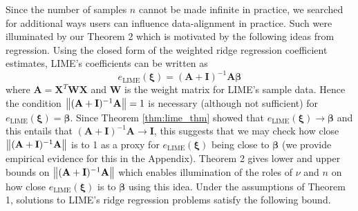 \documentclass[mnsc,blindrev]{informs3}
\begin{document}
             
            Since the number of samples $n$ cannot be made infinite in practice, we searched for additional ways users can influence data-alignment in practice. Such were illuminated by our Theorem 2 which is motivated by the following ideas from regression. Using the closed form of the weighted ridge regression coefficient estimates, LIME's coefficients can be written as
            \begin{equation*}
                e_{\text{LIME}}(\boldsymbol{\xi})=(\mathbf{A} + \mathbf{I})^{-1}\mathbf{A} \boldsymbol{\beta}
            \end{equation*}
            where $\mathbf{A} = \mathbf{X}^T \mathbf{W}\mathbf{X}$ and $\mathbf{W}$ is the weight matrix for LIME's sample data.  Hence the condition $\norm{(\mathbf{A} + \mathbf{I})^{-1}\mathbf{A}}=1$ is necessary (although not sufficient) for $e_{\text{LIME}}(\boldsymbol{\xi}) = \boldsymbol{\beta}$. Since Theorem \ref{thm:lime_thm} showed that $e_{\text{LIME}}(\boldsymbol{\xi})\rightarrow \boldsymbol{\beta}$ and this entails that $(\mathbf{A} + \mathbf{I})^{-1}\mathbf{A}\rightarrow \mathbf{I}$, this suggests that we may check how close $\norm{(\mathbf{A} + \mathbf{I})^{-1}\mathbf{A}}$ is to 1 as a proxy for $e_{\text{LIME}}(\boldsymbol{\xi})$ being close to $\boldsymbol{\beta}$ (we provide empirical evidence for this in the Appendix). Theorem 2 gives lower and upper bounds on $\norm{(\mathbf{A} + \mathbf{I})^{-1}\mathbf{A}}$ which enables illumination of the roles of $\nu$ and $n$ on how close $e_{\text{LIME}}(\boldsymbol{\xi})$ is to $\boldsymbol{\beta}$ using this idea.  Under the assumptions of Theorem 1, solutions to LIME's ridge regression problems satisfy the following bound.
            
\end{document}
